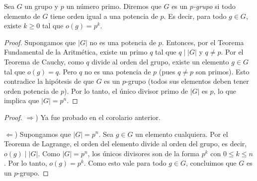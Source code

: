 \begin{defi}
    Sea $G$ un grupo y $p$ un número primo. Diremos que $G$ es un \textit{$p$-grupo} si todo elemento de $G$ tiene orden igual a una potencia de $p$. Es decir, para todo $g \in G$, existe $k \ge 0$ tal que $o(g) = p^k$.
\end{defi}



\begin{proof}
    Supongamos que $|G|$ no es una potencia de $p$.
    Entonces, por el Teorema Fundamental de la Aritmética, existe un primo $q$ tal que $q \mid |G|$ y $q \neq p$.
    Por el Teorema de Cauchy, como $q$ divide al orden del grupo, existe un elemento $g \in G$ tal que $o(g) = q$.
    Pero $q$ no es una potencia de $p$ (pues $q \neq p$ son primos).
    Esto contradice la hipótesis de que $G$ es un $p$-grupo (todos sus elementos deben tener orden potencia de $p$).
    Por lo tanto, el único divisor primo de $|G|$ es $p$, lo que implica que $|G| = p^n$.
\end{proof}



\begin{proof}
    $\Rightarrow$) Ya fue probado en el corolario anterior.
    
    $\Leftarrow$) Supongamos que $|G| = p^n$.
    Sea $g \in G$ un elemento cualquiera.
    Por el Teorema de Lagrange, el orden del elemento divide al orden del grupo, es decir, $o(g) \mid |G|$.
    Como $|G| = p^n$, los únicos divisores son de la forma $p^k$ con $0 \le k \le n$.
    Por lo tanto, $o(g) = p^k$.
    Como esto vale para todo $g \in G$, concluimos que $G$ es un $p$-grupo.
\end{proof}

